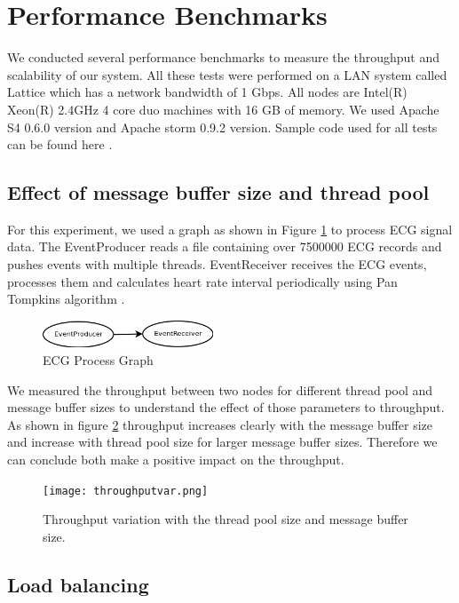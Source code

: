 \section{Performance Benchmarks}

We conducted several performance benchmarks to measure the throughput and scalability of our system. All these tests were performed on a LAN system called Lattice which has a network bandwidth of 1 Gbps. All nodes are Intel(R) Xeon(R) 2.4GHz 4 core duo machines with 16 GB of memory. We used Apache S4 0.6.0 version and Apache storm 0.9.2 version. Sample code used for all tests can be found here \cite{solutionCode}.


\subsection{Effect of message buffer size and thread pool}
For this experiment, we used a graph as shown in Figure \ref{ecgGraph} to process ECG signal data. The EventProducer reads a file containing over 7500000
 ECG records and pushes events with multiple threads. EventReceiver receives the ECG events, processes them and calculates heart rate interval periodically using Pan Tompkins algorithm \cite{kohler2002principles}. 

\begin{figure}[!t]
        \centering
        \includegraphics[width=2.0in]{ecgGraph.png}
        \caption{ECG Process Graph}
        \label{ecgGraph}
\end{figure}


We measured the throughput between two nodes for different thread pool and message buffer sizes to understand the effect of those parameters to throughput. As shown in figure \ref{throughputvar} throughput increases clearly with the message buffer size and increase with thread pool size for larger message buffer sizes. Therefore we can conclude both make a positive impact on the throughput.

\begin{figure}[!t]
        \centering
        \texttt{[image: throughputvar.png]}
        \caption{Throughput variation with the thread pool size and message buffer size.}
        \label{throughputvar}
\end{figure}

\subsection{Load balancing}

